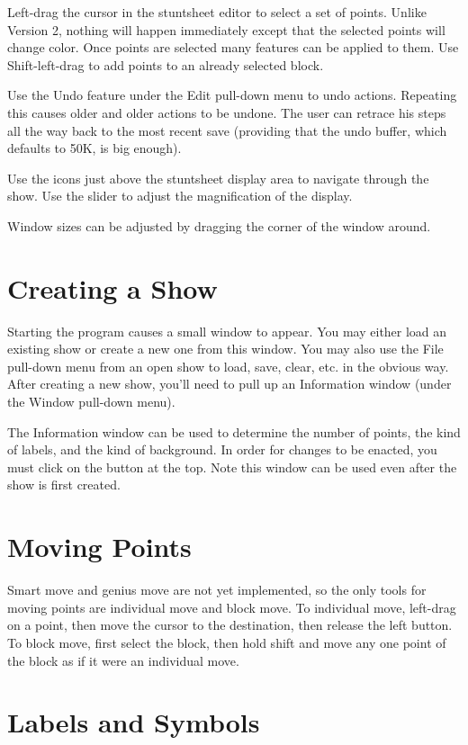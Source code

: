 Left-drag the cursor in the stuntsheet editor to select a set of points.
Unlike Version 2, nothing will happen immediately except that the
selected points will change color.  Once points are selected many
features can be applied to them.  Use Shift-left-drag to add points to
an already selected block.

Use the Undo feature under the Edit pull-down menu to undo actions.
Repeating this causes older and older actions to be undone.  The user
can retrace his steps all the way back to the most recent save
(providing that the undo buffer, which defaults to 50K, is big enough).

Use the icons just above the stuntsheet display area to navigate through
the show.  Use the slider to adjust the magnification of the display.

Window sizes can be adjusted by dragging the corner of the window
around.

\section{Creating a Show}\label{newshow}

Starting the program causes a small window to appear.  You may either
load an existing show or create a new one from this window.  You may
also use the File pull-down menu from an open show to load, save, clear,
etc. in the obvious way.  After creating a new show, you'll need to pull
up an Information window (under the Window pull-down menu).

The Information window can be used to determine the number of points, the
kind of labels, and the kind of background.  In order for changes to be
enacted, you must click on the button at the top.  Note this window can be
used even after the show is first created.

\section{Moving Points}\label{movement}

Smart move and genius move are not yet implemented, so the only tools for
moving points are individual move and block move.  To individual move,
left-drag on a point, then move the cursor to the destination, then release
the left button.  To block move, first select the block, then hold shift
and move any one point of the block as if it were an individual move.

\section{Labels and Symbols}\label{symbols}

